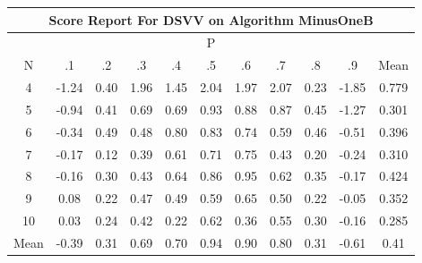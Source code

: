 \documentclass[11pt,a4paper]{report}
\begin{document}
\begin{longtable}{ | c || c | c | c | c | c | c | c | c | c || c |}
\hline
\multicolumn{11}{|c|}{ Score Report For DSVV on Algorithm MinusOneB} \\
\hline
\multicolumn{11}{|c|}{ P } \\
\hline
N & .1 & .2 & .3 & .4 & .5 & .6 & .7 & .8 & .9 & Mean\\
 \hline
 \hline
 \endhead
  4 &  \cellcolor[HTML]{FFDFDF} -1.24 &  \cellcolor[HTML]{F7F7FF} 0.40 &  \cellcolor[HTML]{CFCFFF} 1.96 &  \cellcolor[HTML]{D7D7FF} 1.45 &  \cellcolor[HTML]{CFCFFF} 2.04 &  \cellcolor[HTML]{CFCFFF} 1.97 &  \cellcolor[HTML]{C7C7FF} 2.07 &  \cellcolor[HTML]{F7F7FF} 0.23 &  \cellcolor[HTML]{FFCFCF} -1.85 & 0.779 \\
  5 &  \cellcolor[HTML]{FFE7E7} -0.94 &  \cellcolor[HTML]{F7F7FF} 0.41 &  \cellcolor[HTML]{EFEFFF} 0.69 &  \cellcolor[HTML]{EFEFFF} 0.69 &  \cellcolor[HTML]{E7E7FF} 0.93 &  \cellcolor[HTML]{E7E7FF} 0.88 &  \cellcolor[HTML]{E7E7FF} 0.87 &  \cellcolor[HTML]{F7F7FF} 0.45 &  \cellcolor[HTML]{FFDFDF} -1.27 & 0.301 \\
  6 &  \cellcolor[HTML]{FFF7F7} -0.34 &  \cellcolor[HTML]{EFEFFF} 0.49 &  \cellcolor[HTML]{EFEFFF} 0.48 &  \cellcolor[HTML]{E7E7FF} 0.80 &  \cellcolor[HTML]{E7E7FF} 0.83 &  \cellcolor[HTML]{EFEFFF} 0.74 &  \cellcolor[HTML]{EFEFFF} 0.59 &  \cellcolor[HTML]{F7F7FF} 0.46 &  \cellcolor[HTML]{FFEFEF} -0.51 & 0.396 \\
  7 &  \cellcolor[HTML]{FFF7F7} -0.17 &  \cellcolor[HTML]{FFFFFF} 0.12 &  \cellcolor[HTML]{F7F7FF} 0.39 &  \cellcolor[HTML]{EFEFFF} 0.61 &  \cellcolor[HTML]{EFEFFF} 0.71 &  \cellcolor[HTML]{EFEFFF} 0.75 &  \cellcolor[HTML]{F7F7FF} 0.43 &  \cellcolor[HTML]{F7F7FF} 0.20 &  \cellcolor[HTML]{FFF7F7} -0.24 & 0.310 \\
  8 &  \cellcolor[HTML]{FFF7F7} -0.16 &  \cellcolor[HTML]{F7F7FF} 0.30 &  \cellcolor[HTML]{F7F7FF} 0.43 &  \cellcolor[HTML]{EFEFFF} 0.64 &  \cellcolor[HTML]{E7E7FF} 0.86 &  \cellcolor[HTML]{E7E7FF} 0.95 &  \cellcolor[HTML]{EFEFFF} 0.62 &  \cellcolor[HTML]{F7F7FF} 0.35 &  \cellcolor[HTML]{FFF7F7} -0.17 & 0.424 \\
  9 &  \cellcolor[HTML]{FFFFFF} 0.08 &  \cellcolor[HTML]{F7F7FF} 0.22 &  \cellcolor[HTML]{F7F7FF} 0.47 &  \cellcolor[HTML]{EFEFFF} 0.49 &  \cellcolor[HTML]{EFEFFF} 0.59 &  \cellcolor[HTML]{EFEFFF} 0.65 &  \cellcolor[HTML]{EFEFFF} 0.50 &  \cellcolor[HTML]{F7F7FF} 0.22 &  \cellcolor[HTML]{FFFFFF} -0.05 & 0.352 \\
  10 &  \cellcolor[HTML]{FFFFFF} 0.03 &  \cellcolor[HTML]{F7F7FF} 0.24 &  \cellcolor[HTML]{F7F7FF} 0.42 &  \cellcolor[HTML]{F7F7FF} 0.22 &  \cellcolor[HTML]{EFEFFF} 0.62 &  \cellcolor[HTML]{F7F7FF} 0.36 &  \cellcolor[HTML]{EFEFFF} 0.55 &  \cellcolor[HTML]{F7F7FF} 0.30 &  \cellcolor[HTML]{FFF7F7} -0.16 & 0.285 \\
 \hline
 \hline
Mean &  \cellcolor[HTML]{FFF7F7} -0.39 &  \cellcolor[HTML]{F7F7FF} 0.31 &  \cellcolor[HTML]{EFEFFF} 0.69 &  \cellcolor[HTML]{EFEFFF} 0.70 &  \cellcolor[HTML]{E7E7FF} 0.94 &  \cellcolor[HTML]{E7E7FF} 0.90 &  \cellcolor[HTML]{E7E7FF} 0.80 &  \cellcolor[HTML]{F7F7FF} 0.31 &  \cellcolor[HTML]{FFEFEF} -0.61 &  \cellcolor[HTML]{F7F7FF} 0.41
\end{longtable}
\end{document}

